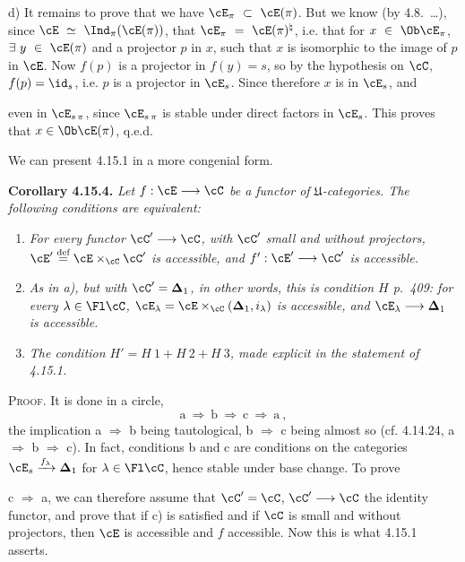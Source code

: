d) It remains to prove that we have $\cE_{\pi} \ \subset \ \cE(\pi)$. But we know (by 4.8.~\dots), since $\cE \ \simeq \ \Ind_{\pi}(\cE(\pi))$, that $\cE_{\pi} \ = \ \cE(\pi)^{\natural}$, i.e. that for $x \ \in \ \Ob \cE_{\pi}$, $\exists \ y \ \in \ \cE(\pi)$ and a projector $p$ in $x$, such that $x$ is isomorphic to the image of $p$ in $\cE$. Now $f(p)$ is a projector in $f(y) = s$, so by the hypothesis on $\cC$, $f(p) = \id_s$, i.e. $p$ is a projector in $\cE_s$. Since therefore $x$ is in $\cE_s$, and

even in $\cE_{s\,\pi}$, since $\cE_{s\,\pi}$ is stable under direct factors in $\cE_s$. This proves that $x \in \Ob \cE(\pi)$, q.e.d.

We can present 4.15.1 in a more congenial form.

\textbf{Corollary 4.15.4.} \textit{Let $f : \cE \longrightarrow \cC$ be a functor of $\mathfrak{U}$-categories. The following conditions are equivalent:}
\begin{enumerate}
\item[\textit{a)}] \textit{For every functor $\cC' \longrightarrow \cC$, with $\cC'$ small and without projectors, $\cE' \overset{\text{def}}{=} \cE \times_{\cC} \cC'$ is accessible, and $f' : \cE' \longrightarrow \cC'$ is accessible.}
\item[\textit{b)}] \textit{As in a), but with $\cC' = \mathbf{\Delta}_1$, in other words, this is condition $H$ p.~409: for every $\lambda \in \Fl \cC$, $\cE_{\lambda} = \cE \times_{\cC} (\mathbf{\Delta}_1, i_{\lambda})$ is accessible, and $\cE_{\lambda} \longrightarrow \mathbf{\Delta}_1$ is accessible.}
\item[\textit{c)}] \textit{The condition $H' = H\ \mathit{1} + H\ \mathit{2} + H\ \mathit{3}$, made explicit in the statement of 4.15.1.}
\end{enumerate}
\textsc{Proof}. It is done in a circle,
\[
\mathrm{a} \ \Longrightarrow \ \mathrm{b} \ \Longrightarrow \ \mathrm{c} \ \Longrightarrow \ \mathrm{a} \ ,
\]
the implication a $\Longrightarrow$ b being tautological, b $\Longrightarrow$ c being almost so (cf. 4.14.24, a $\Longrightarrow$ b $\Longrightarrow$ c). In fact, conditions b and c are conditions on the categories $\cE_s \xrightarrow{f_{\lambda}} \mathbf{\Delta}_1$ for $\lambda \in \Fl \cC$, hence stable under base change. To prove

c $\Longrightarrow$ a, we can therefore assume that $\cC' = \cC$, $\cC' \longrightarrow \cC$ the identity functor, and prove that if c) is satisfied and if $\cC$ is small and without projectors, then $\cE$ is accessible and $f$ accessible. Now this is what 4.15.1 asserts.

